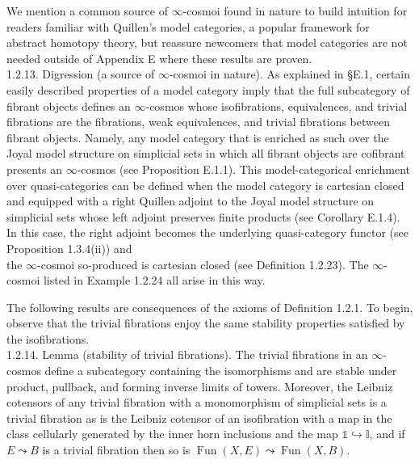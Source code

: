 \documentclass[10pt]{article}
\begin{document}
We mention a common source of $\infty$-cosmoi found in nature to build intuition for readers familiar with Quillen's model categories, a popular framework for abstract homotopy theory, but reassure newcomers that model categories are not needed outside of Appendix E where these results are proven.\\
1.2.13. Digression (a source of $\infty$-cosmoi in nature). As explained in §E.1, certain easily described properties of a model category imply that the full subcategory of fibrant objects defines an $\infty$-cosmos whose isofibrations, equivalences, and trivial fibrations are the fibrations, weak equivalences, and trivial fibrations between fibrant objects. Namely, any model category that is enriched as such over the Joyal model structure on simplicial sets in which all fibrant objects are cofibrant presents an $\infty$-cosmos (see Proposition E.1.1). This model-categorical enrichment over quasi-categories can be defined when the model category is cartesian closed and equipped with a right Quillen adjoint to the Joyal model structure on simplicial sets whose left adjoint preserves finite products (see Corollary E.1.4). In this case, the right adjoint becomes the underlying quasi-category functor (see Proposition 1.3.4(ii)) and\\
the $\infty$-cosmoi so-produced is cartesian closed (see Definition 1.2.23). The $\infty$-cosmoi listed in Example 1.2.24 all arise in this way.

The following results are consequences of the axioms of Definition 1.2.1. To begin, observe that the trivial fibrations enjoy the same stability properties satisfied by the isofibrations.\\
1.2.14. Lemma (stability of trivial fibrations). The trivial fibrations in an $\infty$-cosmos define a subcategory containing the isomorphisms and are stable under product, pullback, and forming inverse limits of towers. Moreover, the Leibniz cotensors of any trivial fibration with a monomorphism of simplicial sets is a trivial fibration as is the Leibniz cotensor of an isofibration with a map in the class cellularly generated by the inner horn inclusions and the map $\mathbb{1} \hookrightarrow \mathbb{I}$, and if $E \leadsto B$ is a trivial fibration then so is $\operatorname{Fun}(X, E) \leadsto \operatorname{Fun}(X, B)$.
\end{document}

